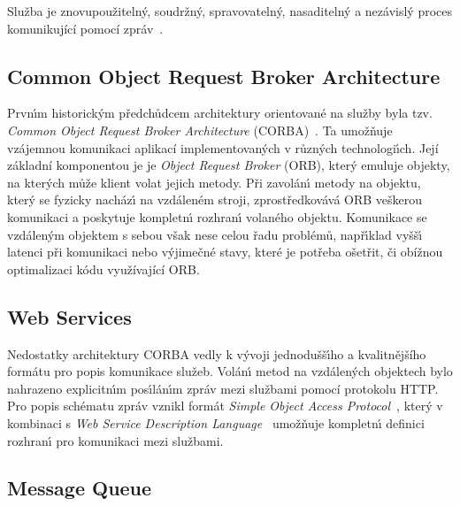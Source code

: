 \begin{definition}
    Služba je znovupoužitelný, soudržný, spravovatelný, nasaditelný a nezávislý proces komunikující
    pomocí zpráv~\cite{papazoglou2003service}\cite{dragoni2017microservices}.
\end{definition}

\subsection{Common Object Request Broker Architecture}\label{sec:corba}

Prvn\'{\i}m historick\'ym předchůdcem architektury orientované na služby
byla tzv. \textit{Common Object Request Broker Architecture}
(\gls{CORBA})~\cite{siegel2000corba}. Ta umožňuje vzájemnou komunikaci aplikací
implementovan\'ych v různ\'ych technologi\'{\i}ch. Její základní komponentou je
je \textit{Object Request Broker} (\gls{ORB}), kter\'y emuluje objekty,
na kter\'ych může klient volat jejich metody. Při zavolán\'{\i} metody
na objektu, kter\'y se fyzicky nacház\'{\i} na vzdáleném stroji,
zprostředkovává \gls{ORB} veškerou komunikaci a poskytuje kompletn\'{\i} rozhran\'{\i}
volaného objektu. Komunikace se vzdálen\'ym objektem s sebou však nese celou řadu problémů,
např\'{\i}klad vyšš\'{\i} latenci při komunikaci nebo v\'yjimečné stavy, které je potřeba
ošetřit, či obížnou optimalizaci kódu využívající \gls{ORB}.

\subsection{Web Services}

Nedostatky architektury \gls{CORBA} vedly k vývoji jednodušš\'{\i}ho
a kvalitnějšího formátu pro popis komunikace služeb. Volán\'{\i} metod na vzdálen\'ych objektech
bylo nahrazeno explicitn\'{\i}m pos\'{\i}lán\'{\i}m zpráv mezi službami pomocí protokolu \gls{HTTP}.
Pro popis schématu zpráv vznikl formát \textit{Simple Object Access
Protocol}~\cite{box2000simple}, kter\'y v kombinaci s
\textit{Web Service Description Language}~\cite{christensen2001web}
umožňuje kompletn\'{\i} definici rozhran\'{\i} pro komunikaci mezi službami.

\subsection{Message Queue}


